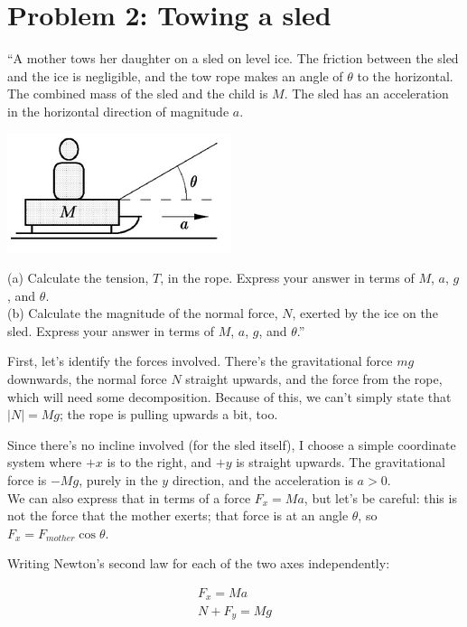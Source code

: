 \documentclass[8.01x]{subfiles}
\begin{document}
\section{Problem 2: Towing a sled}

``A mother tows her daughter on a sled on level ice. The friction between the sled and the ice is negligible, and the tow rope makes an angle of $\theta$ to the horizontal. The combined mass of the sled and the child is $M$. The sled has an acceleration in the horizontal direction of magnitude $a$.

\begin{center}
\includegraphics[scale=0.65]{Graphics/h3p2}
\end{center}

(a) Calculate the tension, $T$, in the rope. Express your answer in terms of $M$, $a$, $g$, and $\theta$.\\
(b) Calculate the magnitude of the normal force, $N$, exerted by the ice on the sled. Express your answer in terms of $M$, $a$, $g$, and $\theta$.''

First, let's identify the forces involved. There's the gravitational force $m g$ downwards, the normal force $N$ straight upwards, and the force from the rope, which will need some decomposition. Because of this, we can't simply state that $|N| = M g$; the rope is pulling upwards a bit, too.

Since there's no incline involved (for the sled itself), I choose a simple coordinate system where $+x$ is to the right, and $+y$ is straight upwards. The gravitational force is $-M g$, purely in the $y$ direction, and the acceleration is $a > 0$.\\
We can also express that in terms of a force $\displaystyle F_x = M a$, but let's be careful: this is not the force that the mother exerts; that force is at an angle $\theta$, so $F_x = F_{mother} \cos \theta$.

Writing Newton's second law for each of the two axes independently:

\begin{align}
F_x = M a\\
N + F_y = M g
\end{align}
\end{document}
